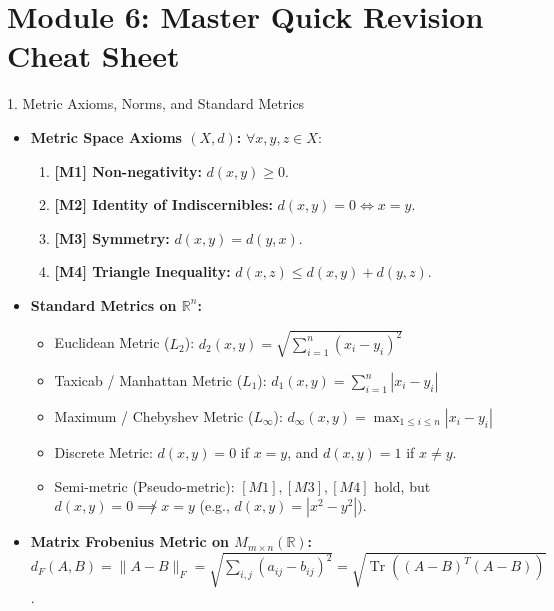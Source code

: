 \documentclass[11pt,a4paper]{article}
\begin{document}
\newpage

\section{Module 6: Master Quick Revision Cheat Sheet}

\begin{formulabox}{1. Metric Axioms, Norms, and Standard Metrics}
\begin{itemize}
    \item \textbf{Metric Space Axioms $(X, d)$:} $\forall x, y, z \in X$:
    \begin{enumerate}
        \item \textbf{[M1] Non-negativity:} $d(x, y) \ge 0$.
        \item \textbf{[M2] Identity of Indiscernibles:} $d(x, y) = 0 \iff x = y$.
        \item \textbf{[M3] Symmetry:} $d(x, y) = d(y, x)$.
        \item \textbf{[M4] Triangle Inequality:} $d(x, z) \le d(x, y) + d(y, z)$.
    \end{enumerate}
    \item \textbf{Standard Metrics on $\mathbb{R}^n$:}
    \begin{itemize}
        \item Euclidean Metric ($L_2$): $d_2(x, y) = \sqrt{\sum_{i=1}^n (x_i - y_i)^2}$
        \item Taxicab / Manhattan Metric ($L_1$): $d_1(x, y) = \sum_{i=1}^n |x_i - y_i|$
        \item Maximum / Chebyshev Metric ($L_\infty$): $d_\infty(x, y) = \max_{1 \le i \le n} |x_i - y_i|$
        \item Discrete Metric: $d(x, y) = 0$ if $x = y$, and $d(x, y) = 1$ if $x \neq y$.
        \item Semi-metric (Pseudo-metric): $[M1], [M3], [M4]$ hold, but $d(x, y) = 0 \not\implies x = y$ (e.g., $d(x, y) = |x^2 - y^2|$).
    \end{itemize}
    \item \textbf{Matrix Frobenius Metric on $M_{m \times n}(\mathbb{R})$:}
    $d_F(A, B) = \|A - B\|_F = \sqrt{\sum_{i,j} (a_{ij} - b_{ij})^2} = \sqrt{\operatorname{Tr}((A - B)^T (A - B))}$.
\end{itemize}
\end{formulabox}
\end{document}
